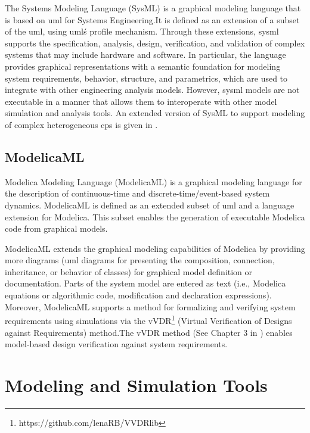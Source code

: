 The Systems Modeling Language (SysML) \cite{sysml} is a graphical modeling language that is based on \acrshort{uml} for Systems Engineering.It is defined as an extension of a subset of the \acrshort{uml}, using \acrshort{uml}\'s profile mechanism. Through these extensions, \acrshort{sysml} supports the specification, analysis, design, verification, and validation of complex systems that may include hardware and software. In particular, the language provides graphical representations with a semantic foundation for modeling system requirements, behavior, structure, and parametrics, which are used to integrate with other engineering analysis models. However, \acrshort{sysml} models are not executable in a manner that allows them to interoperate with other model simulation and analysis tools. An extended version of SysML to support modeling of complex heterogeneous \acrshort{cps} is given in \cite{mbsdjensen}. 

\subsection{ModelicaML}
\label{sec:modelicaml}

Modelica Modeling Language (ModelicaML) \cite{modelicaml, modelicamlreport} is a graphical modeling language for the description of continuous-time and discrete-time/event-based system dynamics. ModelicaML is defined as an extended subset of \acrshort{uml} and a language extension for Modelica. This subset enables the generation of executable Modelica code from graphical models.

ModelicaML extends the graphical modeling capabilities of Modelica by providing more diagrams (\acrshort{uml} diagrams for presenting the composition, connection, inheritance, or behavior of classes) for graphical model definition or documentation. Parts of the system model are entered as text (i.e., Modelica equations or algorithmic code, modification and declaration expressions). Moreover, ModelicaML supports a method for formalizing and verifying system requirements using simulations via the vVDR\footnote{https://github.com/lenaRB/VVDRlib} (Virtual Verification of Designs against Requirements) method.The vVDR method (See Chapter 3 in \cite{modelicamlwladimir, modelicamlverification}) enables model-based design verification against system requirements.


\section{Modeling and Simulation Tools}
\label{sec:tools}


